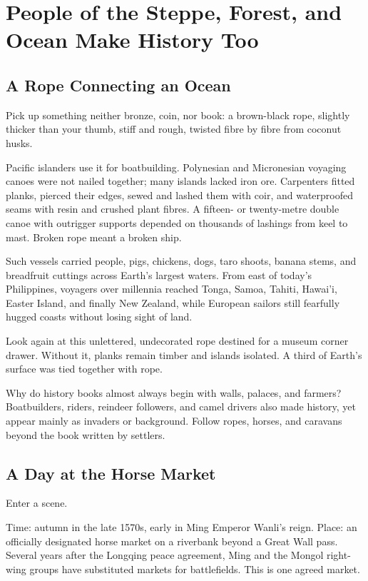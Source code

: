\chapter[Steppe, Forest, and Ocean Histories]{People of the Steppe, Forest, and Ocean Make History Too}
\section{A Rope Connecting an Ocean}
Pick up something neither bronze, coin, nor book: a brown-black rope, slightly thicker than your thumb, stiff and rough, twisted fibre by fibre from coconut husks.

Pacific islanders use it for boatbuilding. Polynesian and Micronesian voyaging canoes were not nailed together; many islands lacked iron ore. Carpenters fitted planks, pierced their edges, sewed and lashed them with coir, and waterproofed seams with resin and crushed plant fibres. A fifteen- or twenty-metre double canoe with outrigger supports depended on thousands of lashings from keel to mast. Broken rope meant a broken ship.

Such vessels carried people, pigs, chickens, dogs, taro shoots, banana stems, and breadfruit cuttings across Earth's largest waters. From east of today's Philippines, voyagers over millennia reached Tonga, Samoa, Tahiti, Hawai'i, Easter Island, and finally New Zealand, while European sailors still fearfully hugged coasts without losing sight of land.

Look again at this unlettered, undecorated rope destined for a museum corner drawer. Without it, planks remain timber and islands isolated. A third of Earth's surface was tied together with rope.

Why do history books almost always begin with walls, palaces, and farmers? Boatbuilders, riders, reindeer followers, and camel drivers also made history, yet appear mainly as invaders or background. Follow ropes, horses, and caravans beyond the book written by settlers.

\section{A Day at the Horse Market}
Enter a scene.

Time: autumn in the late 1570s, early in Ming Emperor Wanli's reign. Place: an officially designated horse market on a riverbank beyond a Great Wall pass. Several years after the Longqing peace agreement, Ming and the Mongol right-wing groups have substituted markets for battlefields. This is one agreed market.


